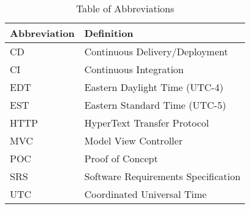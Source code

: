 \documentclass[12pt, titlepage]{article}
\begin{document}
\begin{table}[hbp]
    \caption{Table of Abbreviations}
    \label{Table}
    \begin{tabularx}{\textwidth}{p{3cm}X}
        \toprule
        \textbf{Abbreviation} & \textbf{Definition} \\
        \midrule
        CD & Continuous Delivery/Deployment\\
        CI & Continuous Integration\\
        EDT & Eastern Daylight Time (UTC-4)\\
        EST & Eastern Standard Time (UTC-5)\\
        HTTP & HyperText Transfer Protocol\\
        MVC & Model View Controller\\
        POC & Proof of Concept\\
        SRS & Software Requirements Specification\\
        UTC & Coordinated Universal Time\\
        \bottomrule
    \end{tabularx}
\end{table}
\newpage
\end{document}
